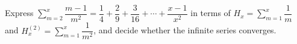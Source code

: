 Express $\displaystyle\sum_{m=2}^{x}\dfrac{m-1}{m^2}=\dfrac14+\dfrac29+\dfrac3{16}+\cdots+\dfrac{x-1}{x^2}$ in terms of $H_x=\sum_{m=1}^x\dfrac1m$ and $H_x^{(2)}=\sum_{m=1}^x\dfrac1{m^2}$, and decide whether the infinite series converges.
